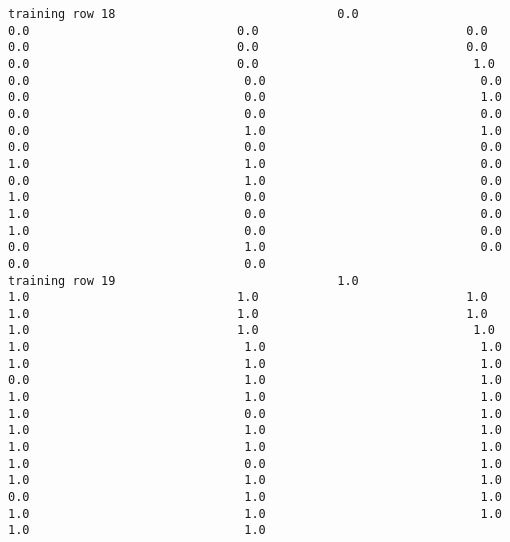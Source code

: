 \documentclass[11pt]{article}
\begin{document}
\begin{verbatim}
training row 18                               0.0                             0.0                             0.0                             0.0                             0.0                             0.0                             0.0                             0.0                             0.0                              1.0                              0.0                              0.0                              0.0                              0.0                              0.0                              1.0                              0.0                              0.0                              0.0                              0.0                              1.0                              1.0                              0.0                              0.0                              0.0                              1.0                              1.0                              0.0                              0.0                              1.0                              0.0                              1.0                              0.0                              0.0                              1.0                              0.0                              0.0                              1.0                              0.0                              0.0                              0.0                              1.0                              0.0                              0.0                              0.0
training row 19                               1.0                             1.0                             1.0                             1.0                             1.0                             1.0                             1.0                             1.0                             1.0                              1.0                              1.0                              1.0                              1.0                              1.0                              1.0                              1.0                              0.0                              1.0                              1.0                              1.0                              1.0                              1.0                              1.0                              0.0                              1.0                              1.0                              1.0                              1.0                              1.0                              1.0                              1.0                              1.0                              0.0                              1.0                              1.0                              1.0                              1.0                              0.0                              1.0                              1.0                              1.0                              1.0                              1.0                              1.0                              1.0

\end{verbatim}
\end{document}
